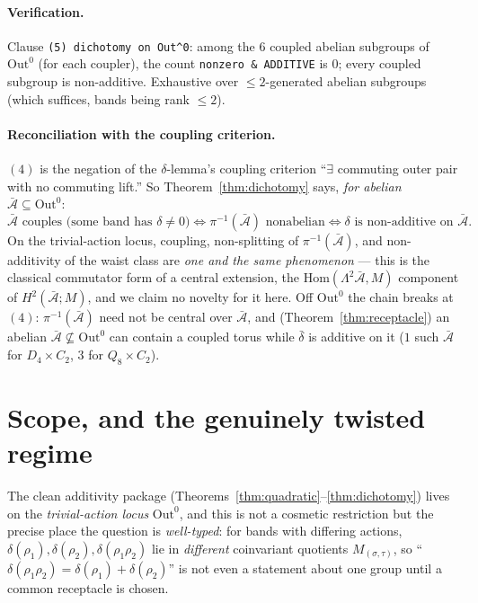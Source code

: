 \documentclass[11pt]{article}
\theoremstyle{definition}
\newcommand{\Out}{\mathrm{Out}}
\newcommand{\Hom}{\mathrm{Hom}}
\newcommand{\Ab}{\bar{\mathcal{A}}}
\begin{document}
\paragraph{Verification.}
Clause \texttt{(5) dichotomy on Out\^{}0}: among the $6$ coupled abelian subgroups of
$\Out^0$ (for each coupler), the count \texttt{nonzero \& ADDITIVE} is \textbf{$0$};
every coupled subgroup is non-additive. Exhaustive over $\le2$-generated abelian
subgroups (which suffices, bands being rank $\le2$).

\paragraph{Reconciliation with the coupling criterion.}
$(4)$ is the negation of the $\delta$-lemma's coupling criterion ``$\exists$ commuting
outer pair with no commuting lift.'' So Theorem~\ref{thm:dichotomy} says, \emph{for
abelian $\Ab\subseteq\Out^0$}:
\[
\Ab\text{ couples (some band has }\delta\neq0)\iff\pi^{-1}(\Ab)\text{ nonabelian}
\iff\delta\text{ is non-additive on }\Ab.
\]
On the trivial-action locus, coupling, non-splitting of $\pi^{-1}(\Ab)$, and
non-additivity of the waist class are \emph{one and the same phenomenon} --- this is the
classical commutator form of a central extension, the $\Hom(\Lambda^2\Ab,M)$ component
of $H^2(\Ab;M)$, and we claim no novelty for it here. Off $\Out^0$ the chain breaks at
$(4)$: $\pi^{-1}(\Ab)$ need not be central over $\Ab$, and (Theorem~\ref{thm:receptacle})
an abelian $\Ab\not\subseteq\Out^0$ can contain a coupled torus while $\bar\delta$ is
additive on it ($1$ such $\Ab$ for $D_4\times C_2$, $3$ for $Q_8\times C_2$).

\section{Scope, and the genuinely twisted regime}\label{sec:scope}

The clean additivity package (Theorems~\ref{thm:quadratic}--\ref{thm:dichotomy}) lives
on the \emph{trivial-action locus} $\Out^0$, and this is not a cosmetic restriction but
the precise place the question is \emph{well-typed}: for bands with differing actions,
$\delta(\rho_1),\delta(\rho_2),\delta(\rho_1\rho_2)$ lie in \emph{different} coinvariant
quotients $M_{(\sigma,\tau)}$, so ``$\delta(\rho_1\rho_2)=\delta(\rho_1)+\delta(\rho_2)$''
is not even a statement about one group until a common receptacle is chosen.
\end{document}
